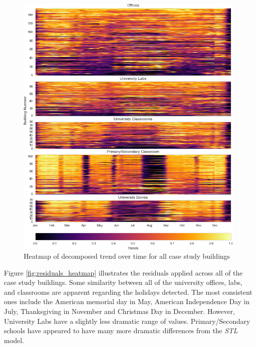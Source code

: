 \begin{figure}[ht!]
\begin{center}
\includegraphics[width=1\columnwidth]{figures/stl_weathernorm_trend_heatmap/stl_weathernorm_trend_heatmap}
\caption{Heatmap of decomposed trend over time for all case study buildings
\label{fig:trend_heatmap}%
}
\end{center}
\end{figure}

Figure \ref{fig:residuals_heatmap} illustrates the residuals applied across all of the case study buildings. Some similarity between all of the university offices, labs, and classrooms are apparent regarding the holidays detected. The most consistent ones include the American memorial day in May, American Independence Day in July, Thanksgiving in November and Christmas Day in December. However, University Labs have a slightly less dramatic range of values. Primary/Secondary schools have appeared to have many more dramatic differences from the \emph{STL} model. 

